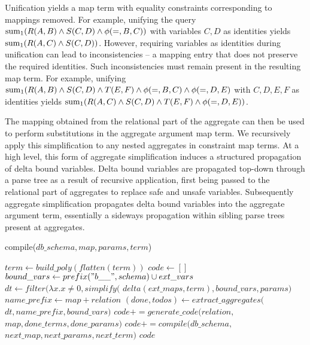 Unification yields a map term with equality constraints corresponding
to mappings removed. 
For example, unifying the query
$\mathrm{sum}_{1}(R(A,B) \wedge S(C,D) \wedge \phi(=,B,C))$
with variables $C,D$ as identities yields $\mathrm{sum}_{1}(R(A,C) \wedge S(C,D))$.
However, requiring variables as identities during
unification can lead to inconsistencies -- a mapping entry that does not
preserve the required identities. Such inconsistencies must remain present in
the resulting map term.
For example, unifying
$\mathrm{sum}_{1}(R(A,B) \wedge S(C,D) \wedge T(E,F) \wedge \phi(=,B,C) \wedge
\phi(=,D,E)$ with $C,D,E,F$ as identities yields
 $\mathrm{sum}_{1}(R(A,C) \wedge S(C,D) \wedge T(E,F) \wedge \phi(=,D,E))$.

The mapping obtained from the relational part of the aggregate can then be used
to perform substitutions in the aggregate argument map term. We recursively
apply this simplification to any nested aggregates in constraint map terms.
At a high level, this form of aggregate simplification induces a structured
propagation of delta bound variables. Delta bound variables are propagated
top-down through a parse tree as a result of recursive application, first being
passed to the relational part of aggregates to replace safe and unsafe
variables. Subsequently aggregate simplification propagates delta bound
variables into the aggregate argument term, essentially a sideways propagation
within sibling parse trees present at aggregates.

\newcommand{\indentcode}{\hspace{5mm}}
\begin{algorithm}[htbp]
\caption{compile($db\_schema, map, params, term$)}
\label{alg:compile}
\begin{algorithmic}[1]
  \STATE {}
  \STATE $term \leftarrow build\_poly(flatten(term))$
\ENDIF
\STATE $code \leftarrow []$
  \STATE {}
  \STATE $bound\_vars \leftarrow prefix("b\_\_", schema) \cup ext\_vars$
  \STATE $dt \leftarrow filter(\lambda x. x \neq 0, simplify($
    \STATE \indentcode $delta(ext\_maps,term),bound\_vars, params)$
  \STATE $name\_prefix \leftarrow map+relation$
  \STATE $(done, todos) \leftarrow extract\_aggregates($
    \STATE \indentcode $dt, name\_prefix, bound\_vars)$
     \STATE $code += generate\_code(relation,$
     \STATE \indentcode $map, done\_terms, done\_params)$
  \ENDFOR
  \STATE {}
  \STATE $code += compile(db\_schema, $
  \STATE \indentcode $next\_map, next\_params, next\_term)$
  \ENDFOR
\ENDFOR
\RETURN $code$
\end{algorithmic}
\end{algorithm}


